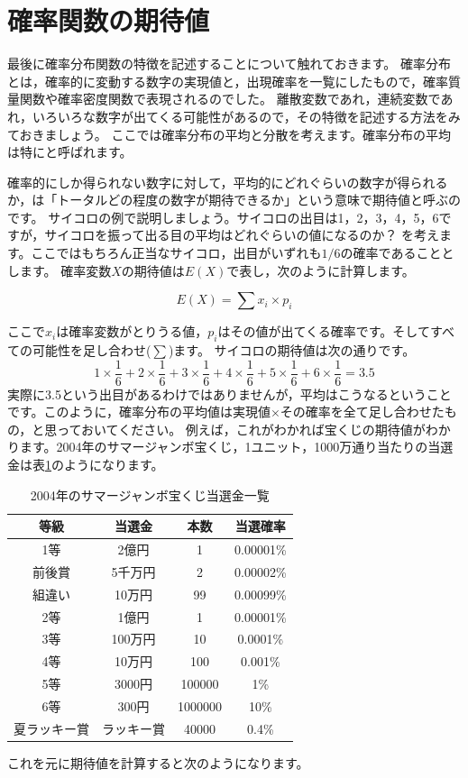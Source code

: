 \documentclass{ltjbook}
\begin{document}
\section{確率関数の期待値}
最後に確率分布関数の特徴を記述することについて触れておきます。
確率分布とは，確率的に変動する数字の実現値と，出現確率を一覧にしたもので，確率質量関数や確率密度関数で表現されるのでした。
離散変数であれ，連続変数であれ，いろいろな数字が出てくる可能性があるので，その特徴を記述する方法をみておきましょう。
ここでは確率分布の平均と分散を考えます。確率分布の平均は特にと呼ばれます。

確率的にしか得られない数字に対して，平均的にどれぐらいの数字が得られるか，は「トータルどの程度の数字が期待できるか」という意味で期待値と呼ぶのです。
サイコロの例で説明しましょう。サイコロの出目は1，2，3，4，5，6ですが，サイコロを振って出る目の平均はどれぐらいの値になるのか？ を考えます。ここではもちろん正当なサイコロ，出目がいずれも$1/6$の確率であることとします。
確率変数$X$の期待値は$E(X)$で表し，次のように計算します。

\[ E(X) = \sum x_i \times p_i \]

ここで$x_i$は確率変数がとりうる値，$p_i$はその値が出てくる確率です。そしてすべての可能性を足し合わせ($\sum$)ます。
サイコロの期待値は次の通りです。
\[1\times\frac{1}{6}+
2\times\frac{1}{6}+
3\times\frac{1}{6}+
4\times\frac{1}{6}+
5\times\frac{1}{6}+
6\times\frac{1}{6}
=3.5\]
実際に3.5という出目があるわけではありませんが，平均はこうなるということです。このように，確率分布の平均値は実現値$\times$その確率を全て足し合わせたもの，と思っておいてください。
例えば，これがわかれば宝くじの期待値がわかります。2004年のサマージャンボ宝くじ，1ユニット，1000万通り当たりの当選金は表\ref{takarakuji}のようになります。


\begin{table}[hb]
    \centering
    \caption{2004年のサマージャンボ宝くじ当選金一覧}
    \begin{tabular}{cccc}
等級 & 当選金 & 本数 & 当選確率 \\\hline
1等 & 2億円 & 1 & 0.00001\% \\
前後賞 & 5千万円 & 2 & 0.00002\% \\
組違い & 10万円 & 99 & 0.00099\% \\
2等 & 1億円 & 1 & 0.00001\% \\
3等 & 100万円 & 10 & 0.0001\% \\
4等 & 10万円 & 100 & 0.001\% \\
5等 & 3000円 & 100000 & 1\% \\
6等 & 300円 & 1000000 & 10\% \\
夏ラッキー賞 & ラッキー賞 & 40000 & 0.4\% \\
    \end{tabular}
    \label{takarakuji}
\end{table}
これを元に期待値を計算すると次のようになります。
\end{document}
